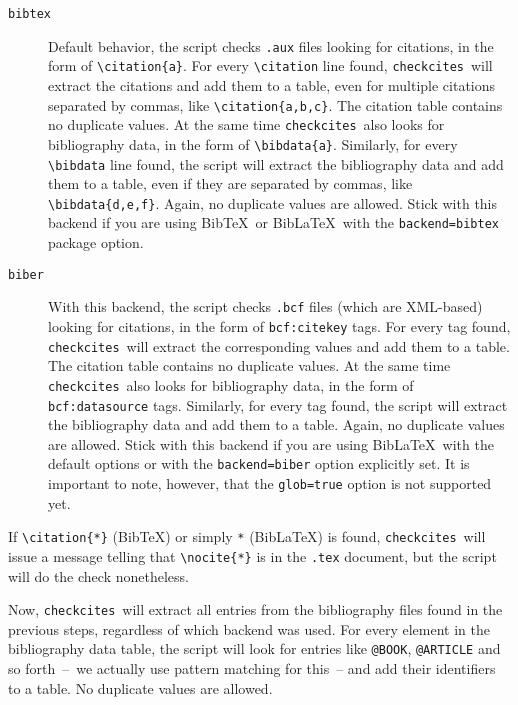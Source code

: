 \documentclass[12pt,a4paper]{article}
\newcommand{\checkcites}{\texttt{checkcites}}
\newenvironment{infoblock}[1]
  {\par\addvspace{\medskipamount}
   \begin{tcolorbox}[colframe=DarkTurquoise,coltitle=black,fonttitle=\bfseries,title=#1]}
  {\end{tcolorbox}\addvspace{\medskipamount}}
\begin{document}
\begin{description}
\item[\texttt{bibtex}]   Default   behavior,    the   script   checks
\verb|.aux|   files   looking  for   citations,   in   the  form   of
\verb|\citation{a}|.   For   every   \verb|\citation|   line   found,
\checkcites\  will   extract  the  citations   and  add  them   to  a
table,  even  for  multiple   citations  separated  by  commas,  like
\verb|\citation{a,b,c}|.  The citation  table  contains no  duplicate
values. At  the same  time \checkcites\  also looks  for bibliography
data,  in  the  form  of  \verb|\bibdata{a}|.  Similarly,  for  every
\verb|\bibdata| line found, the  script will extract the bibliography
data and add them  to a table, even if they  are separated by commas,
like \verb|\bibdata{d,e,f}|. Again, no  duplicate values are allowed.
Stick with this backend if you  are using Bib\TeX\ or Bib\LaTeX\ with
the \verb|backend=bibtex| package option.

\item[\texttt{biber}]   With   this   backend,  the   script   checks
\verb|.bcf| files (which are XML-based) looking for citations, in the
form of  \verb|bcf:citekey| tags.  For every tag  found, \checkcites\
will extract  the corresponding values and  add them to a  table. The
citation  table  contains  no  duplicate values.  At  the  same  time
\checkcites\  also  looks  for  bibliography data,  in  the  form  of
\verb|bcf:datasource|  tags.  Similarly,  for every  tag  found,  the
script will  extract the bibliography data  and add them to  a table.
Again, no  duplicate values are  allowed. Stick with this  backend if
you  are  using Bib\LaTeX\  with  the  default  options or  with  the
\verb|backend=biber| option explicitly set. It  is important to note,
however, that the \verb|glob=true| option is not supported yet.
\end{description}

\begin{infoblock}{Attention!}
If  \verb|\citation{*}|  (Bib\TeX)  or  simply  \verb|*|  (Bib\LaTeX)
is   found,  \checkcites\   will   issue  a   message  telling   that
\verb|\nocite{*}| is in the \verb|.tex| document, but the script will
do the check nonetheless.
\end{infoblock}

Now,  \checkcites\ will  extract  all entries  from the  bibliography
files found  in the previous  steps, regardless of which  backend was
used. For  every element in  the bibliography data table,  the script
will  look  for entries  like  \verb|@BOOK|,  \verb|@ARTICLE| and  so
forth~--~we actually use  pattern matching for this~--  and add their
identifiers to a table. No duplicate values are allowed.
\end{document}
